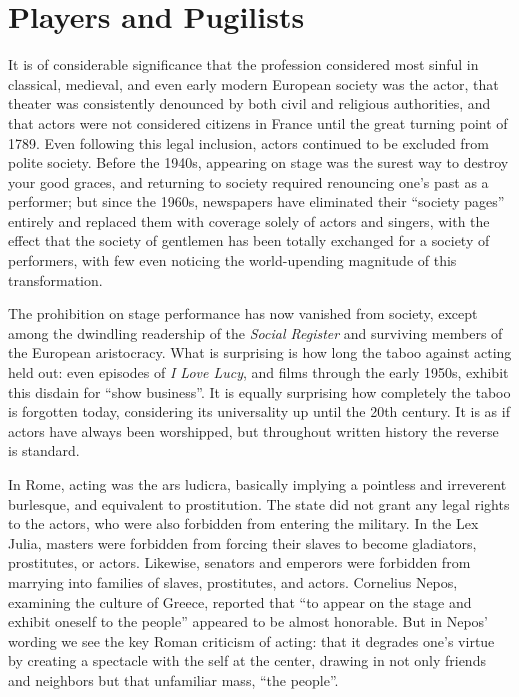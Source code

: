 \section{Players and Pugilists}

It is of considerable significance that the profession considered most sinful in classical, medieval, and even early modern European society was the actor, that theater was consistently denounced by both civil and religious authorities, and that actors were not considered citizens in France until the great turning point of 1789. Even following this legal inclusion, actors continued to be excluded from polite society. Before the 1940s, appearing on stage was the surest way to destroy your good graces, and returning to society required renouncing one's past as a performer; but since the 1960s, newspapers have eliminated their ``society pages'' entirely and replaced them with coverage solely of actors and singers, with the effect that the society of gentlemen has been totally exchanged for a society of performers, with few even noticing the world-upending magnitude of this transformation.

The prohibition on stage performance has now vanished from society, except among the dwindling readership of the \emph{Social Register} and surviving members of the European aristocracy. What is surprising is how long the taboo against acting held out: even episodes of \emph{I Love Lucy}, and films through the early 1950s, exhibit this disdain for ``show business''. It is equally surprising how completely the taboo is forgotten today, considering its universality up until the 20th century. It is as if actors have always been worshipped, but throughout written history the reverse is standard.

In Rome, acting was the ars ludicra, basically implying a pointless and irreverent burlesque, and equivalent to prostitution. The state did not grant any legal rights to the actors, who were also forbidden from entering the military. In the Lex Julia, masters were forbidden from forcing their slaves to become gladiators, prostitutes, or actors. Likewise, senators and emperors were forbidden from marrying into families of slaves, prostitutes, and actors. Cornelius Nepos, examining the culture of Greece, reported that ``to appear on the stage and exhibit oneself to the people'' appeared to be almost honorable. But in Nepos' wording we see the key Roman criticism of acting: that it degrades one's virtue by creating a spectacle with the self at the center, drawing in not only friends and neighbors but that unfamiliar mass, ``the people''.

